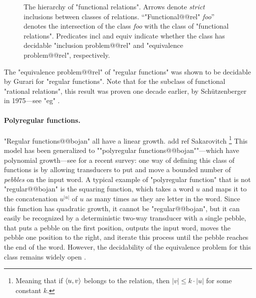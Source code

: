 \begin{figure}
	\caption{
		\AP\label{fig:hierarchy-functional-relations}
		The hierarchy of "functional relations". Arrows denote \emph{strict} inclusions
		between classes of relations.
		``"Functional@@rel" \emph{foo}'' denotes the intersection of the class
		\emph{foo} with the class of "functional relations".
		Predicates \textsf{incl} and \textsf{equiv} indicate
		whether the class has decidable
		"inclusion problem@@rel" and "equivalence problem@@rel", respectively.
	}
\end{figure}

The "equivalence problem@@rel" of "regular functions"
was shown to be decidable by Gurari \cite[Theorem~1]{Gurari1982Equivalence}
for "regular functions". Note that for the subclass of functional "rational relations", this result was proven one decade earlier, by Schützenberger in 1975---see "eg" \cite[Corollary~IV.1.3]{Berstel1979Transductions}.

\paragraph*{Polyregular functions.}
"Regular functions@@bojan" all have a linear growth.%
add ref Sakarovitch
\footnote{Meaning that if $\langle u,v\rangle$ belongs to the relation, then $|v| \leq k\cdot |u|$
for some constant $k$.}
This model has been generalized to \AP""polyregular
functions@@bojan""---which have polynomial growth---see \cite{Bojanczyk2022Transducers} for
a recent survey: one way of defining this class of functions is by allowing transducers
to put and move a bounded number of \emph{pebbles} on the input word.
A typical example of "polyregular function" that is not "regular@@bojan"
is the squaring function, which takes a word $u$ and maps it to
the concatenation $u^{|u|}$ of $u$ as many times as they are letter in the word.
Since this function has quadratic growth, it cannot be "regular@@bojan", but
it can easily be recognized by a deterministic two-way transducer with a single pebble,
that puts a pebble on the first position, outputs the input word, moves
the pebble one position to the right, and iterate this process until the pebble reaches
the end of the word.
However, the decidability of the equivalence problem for this class remains widely open
\cite[\S~8]{Bojanczyk2022Transducers}.

